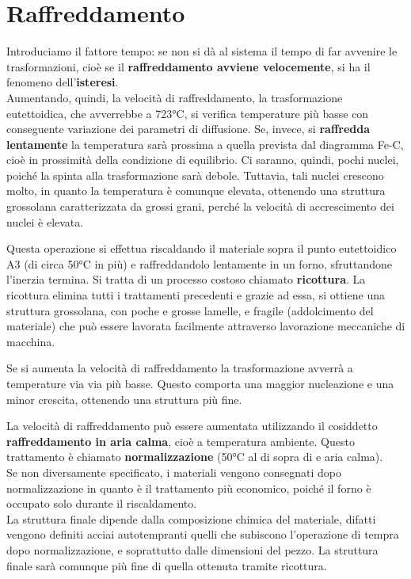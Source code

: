 \section{Raffreddamento}\label{raffreddamento}

Introduciamo il fattore tempo: se non si dà al sistema il tempo di far avvenire le trasformazioni, cioè se il \textbf{raffreddamento avviene velocemente}, si ha il fenomeno dell’\textbf{isteresi}.\\
Aumentando, quindi, la velocità di raffreddamento, la trasformazione eutettoidica, che avverrebbe a 723°C, si verifica temperature più basse con conseguente variazione dei parametri di diffusione. Se, invece, si \textbf{raffredda lentamente} la temperatura sarà prossima a quella prevista dal diagramma Fe-C, cioè in prossimità della condizione di equilibrio. Ci saranno, quindi, pochi nuclei, poiché la spinta alla trasformazione sarà debole. Tuttavia, tali nuclei crescono molto, in quanto la temperatura è comunque elevata, ottenendo una struttura grossolana caratterizzata da grossi grani, perché la velocità di accrescimento dei nuclei è elevata.

Questa operazione si effettua riscaldando il materiale sopra il punto eutettoidico A3 (di circa 50°C in più) e raffreddandolo lentamente in un forno, sfruttandone l’inerzia termina. Si tratta di un processo costoso chiamato \textbf{ricottura}. La ricottura elimina tutti i trattamenti precedenti e grazie ad essa, si ottiene una struttura grossolana, con poche e grosse lamelle, e fragile (addolcimento del materiale) che può essere lavorata facilmente attraverso lavorazione meccaniche di macchina.

Se si aumenta la velocità di raffreddamento la trasformazione avverrà a temperature via via più basse. Questo comporta una maggior nucleazione e una minor crescita, ottenendo una struttura più fine.

La velocità di raffreddamento può essere aumentata utilizzando il cosiddetto \textbf{raffreddamento in aria calma}, cioè a temperatura ambiente. Questo trattamento è chiamato \textbf{normalizzazione} (50°C al di sopra di  e aria calma).\\
Se non diversamente specificato, i materiali vengono consegnati dopo normalizzazione in quanto è il trattamento più economico, poiché il forno è occupato solo durante il riscaldamento.\\
La struttura finale dipende dalla composizione chimica del materiale, difatti vengono definiti acciai autotempranti quelli che subiscono l’operazione di tempra dopo normalizzazione, e soprattutto dalle dimensioni del pezzo. La struttura finale sarà comunque più fine di quella ottenuta tramite ricottura.

